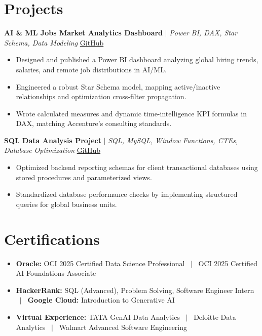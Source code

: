 \documentclass[a4paper,9pt]{article}
\newcommand{\resumeItem}[1]{\item\small #1}
\begin{document}
\vspace{-2mm}

\section{Projects}

\noindent\textbf{AI \& ML Jobs Market Analytics Dashboard} $|$ \textit{Power BI, DAX, Star Schema, Data Modeling} \hfill
\href{https://github.com/hsachan295-source/Power-BI-Portfolio}{\small GitHub}
\begin{itemize}
\resumeItem{Designed and published a Power BI dashboard analyzing global hiring trends, salaries, and remote job distributions in AI/ML.}
\resumeItem{Engineered a robust Star Schema model, mapping active/inactive relationships and optimization cross-filter propagation.}
\resumeItem{Wrote calculated measures and dynamic time-intelligence KPI formulas in DAX, matching Accenture's consulting standards.}
\end{itemize}

\vspace{1.5pt}
\noindent\textbf{SQL Data Analysis Project} $|$ \textit{SQL, MySQL, Window Functions, CTEs, Database Optimization} \hfill
\href{https://github.com/hsachan295-source/smart-business-dashboard}{\small GitHub}
\begin{itemize}
\resumeItem{Optimized backend reporting schemas for client transactional databases using stored procedures and parameterized views.}
\resumeItem{Standardized database performance checks by implementing structured queries for global business units.}
\end{itemize}


\vspace{-2mm}

\section{Certifications}
\begin{itemize}
\resumeItem{\textbf{Oracle:} OCI 2025 Certified Data Science Professional ~$|$~ OCI 2025 Certified AI Foundations Associate}
\resumeItem{\textbf{HackerRank:} SQL (Advanced), Problem Solving, Software Engineer Intern ~$|$~ \textbf{Google Cloud:} Introduction to Generative AI}
\resumeItem{\textbf{Virtual Experience:} TATA GenAI Data Analytics ~$|$~ Deloitte Data Analytics ~$|$~ Walmart Advanced Software Engineering}
\end{itemize}

\vspace{-2mm}
\end{document}
